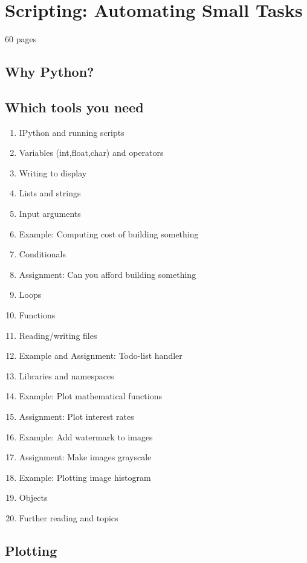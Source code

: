 \chapter{Scripting: Automating Small Tasks}\label{ch:python}
60 pages
\section{Why Python?}
\section{Which tools you need}

\begin{enumerate}
	\item IPython and running scripts
	\item Variables (int,float,char) and operators
	\item Writing to display
	\item Lists and strings
	\item Input arguments
	\item Example: Computing cost of building something
	\item Conditionals
	\item Assignment: Can you afford building something
	\item Loops
	\item Functions
	\item Reading/writing files
	\item Example and Assignment: Todo-list handler
	\item Libraries and namespaces
	\item Example: Plot mathematical functions
	\item Assignment: Plot interest rates
	\item Example: Add watermark to images
	\item Assignment: Make images grayscale
	\item Example: Plotting image histogram
	\item Objects
	\item Further reading and topics
\end{enumerate}

\section{Plotting}\label{sec:python:plotting}